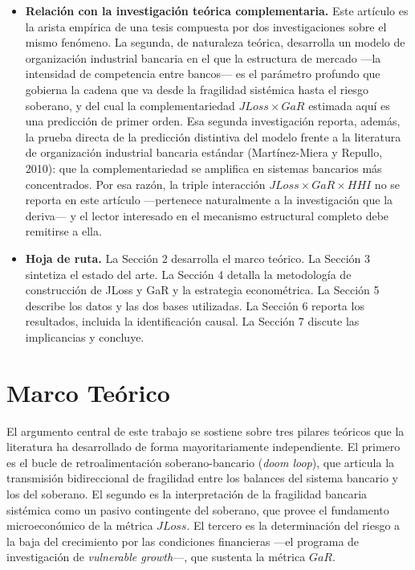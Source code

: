 \documentclass[5p,times,twocolumn,authoryear]{elsarticle}
\begin{document}
\begin{itemize}
    \item \textbf{Relación con la investigación teórica complementaria.} Este artículo es la arista empírica de una tesis compuesta por dos investigaciones sobre el mismo fenómeno. La segunda, de naturaleza teórica, desarrolla un modelo de organización industrial bancaria en el que la estructura de mercado —la intensidad de competencia entre bancos— es el parámetro profundo que gobierna la cadena que va desde la fragilidad sistémica hasta el riesgo soberano, y del cual la complementariedad $JLoss\times GaR$ estimada aquí es una predicción de primer orden. Esa segunda investigación reporta, además, la prueba directa de la predicción distintiva del modelo frente a la literatura de organización industrial bancaria estándar (Martínez-Miera y Repullo, 2010): que la complementariedad se amplifica en sistemas bancarios más concentrados. Por esa razón, la triple interacción $JLoss\times GaR\times HHI$ no se reporta en este artículo —pertenece naturalmente a la investigación que la deriva— y el lector interesado en el mecanismo estructural completo debe remitirse a ella.
    \item \textbf{Hoja de ruta.} La Sección 2 desarrolla el marco teórico. La Sección 3 sintetiza el estado del arte. La Sección 4 detalla la metodología de construcción de JLoss y GaR y la estrategia econométrica. La Sección 5 describe los datos y las dos bases utilizadas. La Sección 6 reporta los resultados, incluida la identificación causal. La Sección 7 discute las implicancias y concluye.
\end{itemize}

\section{Marco Teórico}

El argumento central de este trabajo se sostiene sobre tres pilares teóricos que la literatura ha desarrollado de forma mayoritariamente independiente. El primero es el bucle de retroalimentación soberano-bancario (\textit{doom loop}), que articula la transmisión bidireccional de fragilidad entre los balances del sistema bancario y los del soberano. El segundo es la interpretación de la fragilidad bancaria sistémica como un pasivo contingente del soberano, que provee el fundamento microeconómico de la métrica $JLoss$. El tercero es la determinación del riesgo a la baja del crecimiento por las condiciones financieras —el programa de investigación de \textit{vulnerable growth}—, que sustenta la métrica $GaR$.
\end{document}
